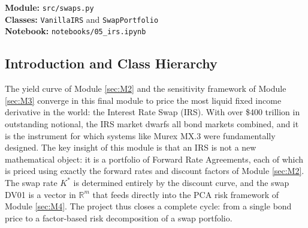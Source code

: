 \documentclass{article}
\theoremstyle{definition}  %
\theoremstyle{plain}  %
\numberwithin{definition}{section}
\numberwithin{proposition}{section}
\numberwithin{theorem}{section}
\numberwithin{equation}{section}
\begin{document}
\begin{tcolorbox}[title = Python Implementation, colback = pythonyellow!70!white, colframe = pythonblue]
    \textbf{Module:} \color{magenta} \texttt{src/swaps.py} \color{black} \\
    \textbf{Classes:} \color{codegreen} \texttt{VanillaIRS} \color{black} and \color{codegreen} \texttt{SwapPortfolio} \color{black} \\
    \textbf{Notebook:} \texttt{notebooks/05\_irs.ipynb}
\end{tcolorbox}

\subsection{Introduction and Class Hierarchy}

The yield curve of Module \ref{sec:M2} and the sensitivity framework of Module \ref{sec:M3} converge in this final module to price the most liquid fixed income derivative in the world: the Interest Rate Swap (IRS). With over \$400 trillion in outstanding notional, the IRS market dwarfs all bond markets combined, and it is the instrument for which systems like Murex MX.3 were fundamentally designed. The key insight of this module is that an IRS is not a new mathematical object: it is a portfolio of Forward Rate Agreements, each of which is priced using exactly the forward rates and discount factors of Module \ref{sec:M2}. The swap rate $K^*$ is determined entirely by the discount curve, and the swap DV01 is a vector in $\mathbb{R}^m$ that feeds directly into the PCA risk framework of Module \ref{sec:M4}. The project thus closes a complete cycle: from a single bond price to a factor-based risk decomposition of a swap portfolio.
\end{document}
